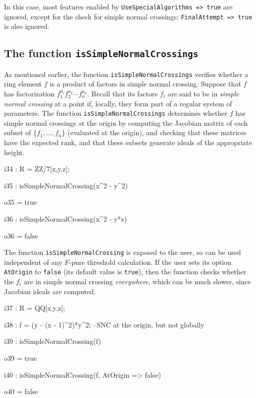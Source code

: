\documentclass{amsart}
\begin{document}
\noindent In this case, most features enabled by \texttt{UseSpecialAlgorithms => true}
are ignored, except for the check for simple normal crossings;  \texttt{FinalAttempt => true}
is also ignored.

\subsection{The function \texttt{isSimpleNormalCrossings}} \label{subsec.SNC}
As mentioned earlier, the function \texttt{isSimpleNormalCrossings} verifies whether a ring element $f$ is a product of factors in simple normal crossing.
Suppose that $f$ has factorization $f_1^{a_i} f_2^{a_2} \cdots f_n^{a_n}$.  Recall that its factors $f_i$ are said to be in
\emph{simple normal crossing} at a point if, locally, they form part of a regular system of parameters.  The function \texttt{isSimpleNormalCrossings} determines whether $f$ has simple normal crossings at the origin by computing the Jacobian matrix of each subset of $\{ f_1, \ldots, f_n \}$ (evaluated at the origin), and checking that these matrices have the expected rank, and that these subsets generate ideals of the appropriate height.

\smallskip
{\small
{}
\begin{MyVerbatim}
i34 : R = ZZ/7[x,y,z];

i35 : isSimpleNormalCrossing(x^2 - y^2)

o35 = true

i36 : isSimpleNormalCrossing(x^2 - y*z)

o36 = false
\end{MyVerbatim}
}
\smallskip

The function \texttt{isSimpleNormalCrossing} is exposed to the user, so can be used independent of any $F$-pure threshold calculation.
If the user sets its option \texttt{AtOrigin} to \texttt{false} (its default value is \texttt{true}), then the function checks whether the $f_i$ are in simple normal crossing \emph{everywhere}, which can be much slower, since Jacobian ideals are computed.

\smallskip
{\small
{}
\begin{MyVerbatim}
i37 : R = QQ[x,y,z];

i38 : f = (y - (x - 1)^2)*y^2; --SNC at the origin, but not globally

i39 : isSimpleNormalCrossing(f)

o39 = true

i40 : isSimpleNormalCrossing(f, AtOrigin => false)

o40 = false
\end{MyVerbatim}
}
\smallskip
\end{document}
